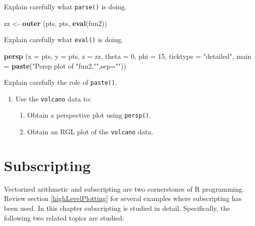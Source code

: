 \documentclass[
]{book}
\newenvironment{Shaded}{\begin{snugshade}}{\end{snugshade}}
\newcommand{\AttributeTok}[1]{\textcolor[rgb]{0.13,0.29,0.53}{#1}}
\newcommand{\DecValTok}[1]{\textcolor[rgb]{0.00,0.00,0.81}{#1}}
\newcommand{\FunctionTok}[1]{\textcolor[rgb]{0.13,0.29,0.53}{\textbf{#1}}}
\newcommand{\NormalTok}[1]{#1}
\newcommand{\OtherTok}[1]{\textcolor[rgb]{0.56,0.35,0.01}{#1}}
\newcommand{\StringTok}[1]{\textcolor[rgb]{0.31,0.60,0.02}{#1}}
\begin{document}
Explain carefully what \texttt{parse()} is doing.

\begin{Shaded}
\begin{Highlighting}[]
\NormalTok{zz }\OtherTok{\textless{}{-}} \FunctionTok{outer}\NormalTok{ (pts, pts, }\FunctionTok{eval}\NormalTok{(fun2))}
\end{Highlighting}
\end{Shaded}

Explain carefully what \texttt{eval()} is doing.

\begin{Shaded}
\begin{Highlighting}[]
\FunctionTok{persp}\NormalTok{ (}\AttributeTok{x =}\NormalTok{ pts, }\AttributeTok{y =}\NormalTok{ pts, }\AttributeTok{z =}\NormalTok{ zz, }\AttributeTok{theta =} \DecValTok{0}\NormalTok{, }\AttributeTok{phi =} \DecValTok{15}\NormalTok{, }\AttributeTok{ticktype =} \StringTok{"detailed"}\NormalTok{, }
       \AttributeTok{main =} \FunctionTok{paste}\NormalTok{(}\StringTok{"Persp plot of \textasciigrave{}"}\NormalTok{fun2,}\StringTok{"\textasciigrave{}"}\NormalTok{,}\AttributeTok{sep=}\StringTok{""}\NormalTok{))}
\end{Highlighting}
\end{Shaded}

Explain carefully the role of \texttt{paste()}.

\begin{enumerate}
\def\labelenumi{\arabic{enumi}.}
\setcounter{enumi}{3}
\item
  Use the \texttt{volcano} data to:

  \begin{enumerate}
  \def\labelenumii{(\roman{enumii})}
  \item
    Obtain a perspective plot using \texttt{persp()}.
  \item
    Obtain an RGL plot of the \texttt{volcano} data.
  \end{enumerate}
\end{enumerate}

\chapter{Subscripting}\label{subscripting}

Vectorized arithmetic and subscripting are two cornerstones of R programming. Review section \ref{highLevelPlotting} for several examples where subscripting has been used. In this chapter subscripting is studied in detail. Specifically, the following two related topics are studied:
\end{document}
